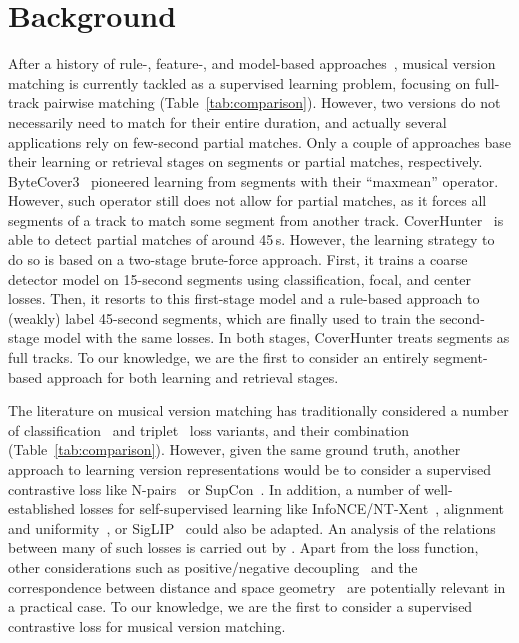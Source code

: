 
\section{Background}
\label{sec:background}

After a history of rule-, feature-, and model-based approaches~\cite{serra_identification_2011, yesiler_audio-based_2021}, musical version matching is currently tackled as a supervised learning problem, focusing on full-track pairwise matching (Table~\ref{tab:comparison}). However, two versions do not necessarily need to match for their entire duration, and actually several applications rely on few-second partial matches. Only a couple of approaches base their learning or retrieval stages on segments or partial matches, respectively. ByteCover3~\cite{du_bytecover3_2023} pioneered learning from segments with their ``maxmean'' operator. However, such operator still does not allow for partial matches, as it forces all segments of a track to match some segment from another track. %
CoverHunter~\cite{liu_coverhunter_2023} is able to detect partial matches of around 45\,s. However, the learning strategy to do so is based on a two-stage brute-force approach. First, it trains a coarse detector model on 15-second segments using classification, focal, and center losses. Then, it resorts to this first-stage model and a rule-based approach to (weakly) label 45-second segments, which are finally used to train the second-stage model with the same losses. In both stages, CoverHunter treats segments as full tracks. To our knowledge, we are the first to consider an entirely segment-based approach for both learning and retrieval stages.

The literature on musical version matching has traditionally considered a number of classification~\cite{sun_deep_2014} and triplet~\cite{schroff_facenet_2015} loss variants, and their combination (Table~\ref{tab:comparison}). However, given the same ground truth, another approach to learning version representations would be to consider a supervised contrastive loss like N-pairs~\cite{sohn_improved_2016} or SupCon~\cite{khosla_supervised_2021}. In addition, a number of well-established losses for self-supervised learning like InfoNCE/NT-Xent~\cite{van_den_oord_representation_2018, chen_simple_2020}, alignment and uniformity~\cite{wang_understanding_2020}, or SigLIP~\cite{zhai_sigmoid_2023} could also be adapted. An analysis of the relations between many of such losses is carried out by \citet{koromilas_bridging_2024}. Apart from the loss function, other considerations such as positive/negative decoupling~\cite{yeh_decoupled_2022} and the correspondence between distance and space geometry~\cite{koishekenov_geometric_2023} are potentially relevant in a practical case. To our knowledge, we are the first to consider a supervised contrastive loss for musical version matching. %

